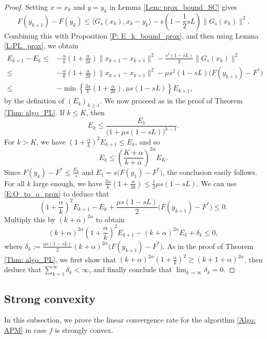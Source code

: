 \documentclass[onefignum,onetabnum]{siamart220329}
\begin{document}
\begin{proof}
Setting $x=x_k$ and $y=y_k$ in Lemma \ref{Lem: prox_bound_SC} gives
$$F(y_{k+1}) - F(y_k) \le \langle G_s(x_k), x_k - y_k \rangle - s\left( 1 - \frac{1}{2}sL \right) \| G_s(x_k) \|^2.$$
Combining this with Proposition \ref{P: E_k_bound_prox}, and then using Lemma \ref{L:PL_prox}, we obtain
\begin{align}
E_{k+1} - E_k
\le & - \frac{\alpha}{k}\left(1+\frac{\alpha}{2k}\right)\| x_{k+1} - x_{k+1} \|^2 - \frac{s^2(1-sL)}{2} \| G_s(x_k) \|^2 \nonumber \\
\le & - \frac{\alpha}{k}\left(1+\frac{\alpha}{2k}\right)\| x_{k+1} - x_{k+1} \|^2 - \mu s^2(1-sL)\big(F(y_{k+1})-F^*\big) \label{E:O_to_o_prox}\\
\le & -\min\left\{ \frac{2\alpha}{k}\left(1+\frac{\alpha}{2k}\right),\mu s(1-sL)\right\}E_{k+1},\nonumber 
\end{align}
by the definition of $(E_k)_{k\ge 1}$. We now proceed as in the proof of Theorem \ref{Thm: algo_PL}. If $k\le K$, then
$$E_k\le\frac{E_1}{\big(1+\mu s(1-sL)\big)^{k-1}}.$$
For $k>K$, we have
$\left(1+\frac{\alpha}{k}\right)^2E_{k+1}\le E_k$,
and so
$$E_k\le \left(\frac{K+\alpha}{k+\alpha}\right)^{2\alpha}E_K.$$
Since $F(y_k)-F^*\le \frac{E_k}{s}$ and $E_1=s\big(F(y_1)-F^*\big)$, the conclusion easily follows. For all $k$ large enough, we have $\frac{2\alpha}{k}\left(1+\frac{\alpha}{2k}\right)\le\frac{1}{2}\mu s(1-sL)$. We can use \eqref{E:O_to_o_prox} to deduce that
$$\left(1+\frac{\alpha}{k}\right)^2E_{k+1}- E_k + \frac{\mu s(1-sL)}{2}\big(F(y_{k+1})-F^*\big)\le 0.$$
Multiply this by $(k+\alpha)^{2\alpha}$ to obtain
$$(k+\alpha)^{2\alpha}\left(1+\frac{\alpha}{k}\right)^2E_{k+1}- (k+\alpha)^{2\alpha}E_k + \delta_k\le 0,$$
where $\delta_k:= \frac{\mu s(1-sL)}{2}(k+\alpha)^{2\alpha}\big(F(y_{k+1})-F^*\big)$. As in the proof of Theorem \ref{Thm: algo_PL}, we first show that $(k+\alpha)^{2\alpha}\left(1+\frac{\alpha}{k}\right)^2\ge (k+1+\alpha)^{2\alpha}$, then deduce that $\sum_{k=1}^\infty\delta_k<\infty$, and finally conclude that $\lim_{k\to\infty}\delta_k=0$.
\end{proof}




\subsection{Strong convexity}
In this subsection, we prove the linear convergence rate for the algorithm \eqref{Algo: APM} in case $f$ is strongly convex.
\end{document}

